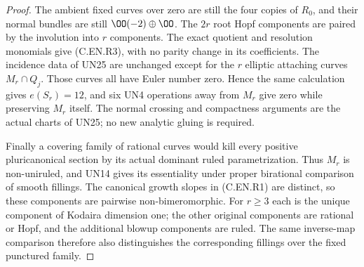 \begin{proof}
The ambient fixed curves over zero
are still the four copies of $R_0$,
and their normal bundles are still
$\OO(-2)\oplus\OO$. The $2r$
root Hopf components are paired
by the involution into $r$ components.
The exact quotient and resolution
monomials give (C.EN.R3), with no
parity change in its coefficients.
The incidence data of UN25 are
unchanged except for the $r$
elliptic attaching curves $M_r\cap Q_j$.
Those curves all have Euler number
zero. Hence the same calculation
gives $e(S_r)=12$, and six UN4
operations away from $M_r$ give
zero while preserving $M_r$ itself.
The normal crossing and compactness
arguments are the actual charts
of UN25; no new analytic gluing
is required.



Finally a covering family of rational
curves would kill every positive
pluricanonical section by its actual
dominant ruled parametrization.
Thus $M_r$ is non-uniruled, and
UN14 gives its essentiality under
proper birational comparison of
smooth fillings. The canonical
growth slopes in (C.EN.R1) are
distinct, so these components
are pairwise non-bimeromorphic.
For $r\ge3$ each is the unique
component of Kodaira dimension
one; the other original components
are rational or Hopf, and the
additional blowup components are
ruled. The same inverse-map
comparison therefore also
distinguishes the corresponding
fillings over the fixed punctured
family.
\end{proof}

